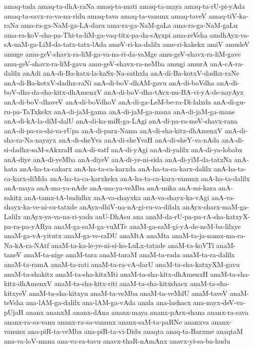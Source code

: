 {amaq-tada
amaq-ta-dhA-raNa
amaq-ta-mati
amaq-ta-maya
amaq-ta-rU-pi-yAda
amaq-ta-savx-ra-va-na-ridu
amaq-tava
amaq-ta-vanunx
amaq-taveV
amaq-tiV-ka-raNa
ama-ra-ga-NaM-ga-LA-daru
ama-ra-ga-NaM-gaLa
ama-ra-ga-NaM-gaLu
ama-ra-koV-sha-pa-Thi-ta-liM-ga-vaq-titx-pa-da-sAyxpi
ama-reVsha
amdhAyx-va-sA-naM-ga-LiM-da-tatx-tatx-lAda
ameV-ri-ka-dalilx
ame-ri-kakekx
amiV
amudeV
amuge
amu-geV-shavx-ra-liM-ga-va-na-ri-da-vaMge
amu-geV-shavx-ra-liM-gave
amu-geV-shavx-ra-liM-gavu
amu-geV-shavx-ra-neMba
amugi
amurA
anA-cA-ra-dalilx
anAdi
anA-di-Ba-katx-la-kaSx-Na-sathxla
anA-di-Ba-kotxV-dadhx-raNe
anA-di-Ba-kotxV-dadhx-raNi
anA-di-boV-dhAM-gavu
anA-di-boVdha
anA-di-boV-dha-da-sha-kitx-dhAmenxV
anA-di-boV-dha-tAvx-nu-BA-vi-yA-de-nayAyx
anA-di-boV-dhaveV
anA-di-boVdhoV
anA-di-ga-LeM-be-ra-Di-lalxda
anA-di-gu-ru-pa-TaTxkekx
anA-di-jaM-gama
anA-di-jaM-ga-mana
anA-di-jaM-ga-mane
anA-di-kA-la-diM-dalU
anA-di-ka-miR-ga-LAgi
anA-di-pa-ra-meV-shavx-rana
anA-di-pa-ra-shi-va-rUpa
anA-di-parx-Nama
anA-di-sha-kitx-dhAmenxV
anA-di-sha-ra-Na-nayayx
anA-di-sheYva
anA-di-sheYvaH
anA-di-sheY-va-nAda
anA-di-si-dadhx-saM-sAkxraH
anA-di-vatf
anA-di-yAgi
anA-di-yalilx
anA-di-ya-lobabx
anA-diye
anA-di-yeMba
anA-diyeV
anA-di-ye-ni-sida
anA-di-yiM-da-tatxNa
anA-hata
anA-ha-ta-cakarx
anA-ha-ta-ca-karxda
anA-ha-ta-ca-karx-dalilx
anA-ha-ta-ca-karx-diMda
anA-ha-ta-ca-karxkekx
anA-ha-ta-ca-karx-vanunx
anA-ha-ta-dalilx
anA-maya
anA-ma-ya-nAde
anA-ma-ya-veMba
anA-mika
anA-mi-kara
anA-sakitx
anA-tamx-tA-budidhx
anA-va-shayxka
anA-va-shayx-ka-vAgi
anA-va-shayx-ka-ve-ni-su-tatxde
anAyx-dhiV-na-nA-gi-ru-va-dilalx
anAyx-sharx-maM-ga-Lalilx
anAyx-ya-va-na-ri-yada
anU-DhAsu
ana
anaM-da-rU-pa-pa-rA-sha-katxyX-pa-ra-pa-yARya
anaM-ga-saM-ga-vuMTe
anaM-ga-saM-gi-yA-de-neM-ba-lilxye
anaM-ga-vA-yitutx
anaM-ga-ve-raDU
anaMtA
anaMta
anaM-ta-ja-namx-ma-ra-Na-kA-ra-NAtf
anaM-ta-ka-le-ye-ni-si-ko-LuLx-tatxde
anaM-ta-koVTi
anaM-taneV
anaM-ta-nige
anaM-tara
anaM-taraM
anaM-ta-rada
anaM-ta-ra-dalilx
anaM-ta-ramA
anaM-ta-rati
anaM-ta-ra-vA-darU
anaM-ta-sha-katxyXM-gavu
anaM-ta-shakitx
anaM-ta-sha-kitxMti
anaM-ta-sha-kitx-dhAmenxH
anaM-ta-sha-kitx-dhAmenxV
anaM-ta-sha-kitx-riti
anaM-ta-sha-kitxshacx
anaM-ta-sha-kitxyeV
anaM-ta-sha-kitxyu
anaM-ta-veMba
anaM-ta-veMdU
anaM-taveV
anaM-teVsha
ana-lAM-ga-dalilx
ana-lAM-ga-vAda
anala
ana-lashacx
ana-nayx-deV-va-pUjaH
ananx
ananxM
ananx-dAna
ananx-maya
ananx-pArx-shana
ananx-ra-sava
ananx-ra-sa-vanu
ananx-ra-sa-vanunx
ananx-saM-ta-paRNe
ananxva
ananx-vanunx
ana-piR-ta-veMba
ana-piR-ta-vi-Didu
anaqta
anaq-ta-Barxme
anaqtaM
ana-va-loV-mana
ana-va-ra-tavu
anavx-thaR-nAmAnx
anavx-yi-sa-ba-hudu
}

